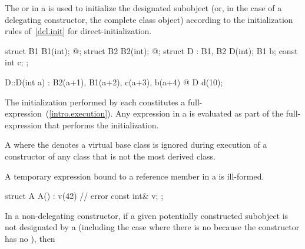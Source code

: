 \pnum
{}%
%
The
or 
in a
is used to initialize the
designated subobject (or, in the case of a delegating constructor, the complete class object)
according to the initialization rules of~\ref{dcl.init} for direct-initialization.
\begin{example}
\begin{codeblock}
struct B1 { B1(int); @\commentellip@ };
struct B2 { B2(int); @\commentellip@ };
struct D : B1, B2 {
  D(int);
  B1 b;
  const int c;
};

D::D(int a) : B2(a+1), B1(a+2), c(a+3), b(a+4) { @\commentellip@ }
D d(10);
\end{codeblock}
\end{example}
\begin{note}
The initialization
performed by each 
constitutes a full-expression~(\ref{intro.execution}).
Any expression in
a
is evaluated as part of the full-expression that performs the initialization.
\end{note}
A  where the  denotes
a virtual base class is ignored during execution of a constructor of any class that is
not the most derived class.

\pnum
A temporary expression bound to a reference member in a 
is ill-formed.
\begin{example}
\begin{codeblock}
struct A {
  A() : v(42) { }   // error
  const int& v;
};
\end{codeblock}
\end{example}

\pnum
In a non-delegating constructor, if
a given potentially constructed subobject is not designated by a
(including the case where there is no
because the constructor has no
),
then

